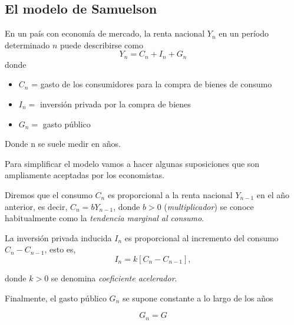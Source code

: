 \documentclass[11pt, a4paper]{article}
\newif\IfInSansMode
\numberwithin{equation}{section}
\theoremstyle{theorem-style}
\theoremstyle{definition-style}
\theoremstyle{remark-style}
\theoremstyle{example-style}
\begin{document}
\subsection{El modelo de Samuelson}

En un país con economía de mercado, la renta nacional $Y_{n}$ en un
        período determinado $n$ puede describirse como
        $$Y_{n} = C_{n} + I_{n} + G_{n}$$
        donde
        \begin{itemize}
        \item $C_{n}$ = gasto de los consumidores para la compra de bienes de
          consumo
        \item $I_{n} = $ inversión privada por la compra de bienes
        \item $G_{n} = $ gasto público
        \end{itemize}

        Donde n se suele medir en años.

        Para simplificar el modelo vamos a hacer algunas suposiciones que son
        ampliamente aceptadas por los economistas.

        Diremos que el consumo $C_{n}$ es proporcional a la renta nacional
        $Y_{n-1}$ en el año anterior, es decir, $C_{n} = bY_{n-1}$, donde $b >
        0$ (\textit{multiplicador}) se conoce habitualmente como la
        \textit{tendencia marginal al consumo}.

        La inversión privada inducida $I_{n}$ es proporcional al incremento del
        consumo $C_{n} - C_{n-1}$, esto es,
        $$I_{n} = k[C_{n} - C_{n-1}],$$

        donde $k > 0$ se denomina \textit{coeficiente acelerador}.

        Finalmente, el gasto público $G_{n}$ se supone constante a lo largo de
        los años

        $$ G_{n} = G $$
\end{document}
